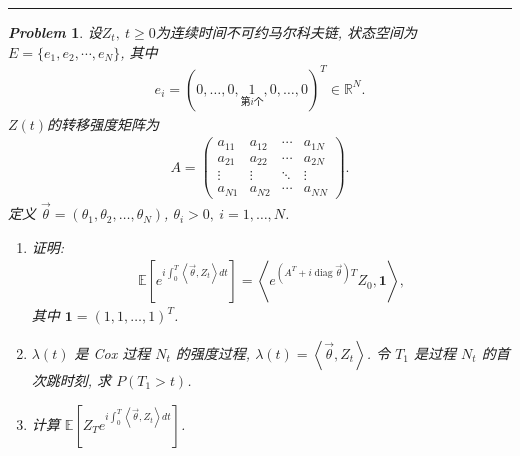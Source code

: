 \documentclass[12pt]{article}
\newtheorem*{problem}{\itshape Problem}
\begin{document}
\hrule height 1pt
\begin{problem}
  设$Z_t,\ t\ge 0$为连续时间不可约马尔科夫链, 状态空间为$E=\{e_1,e_2,\cdots, e_N\}$, 其中
  \begin{eqnarray*}
    {e}_i = (0, \ldots, 0, \underset{\text{第}i \text{个}}{1}, 0, \ldots, 0)^T \in \mathbb{R}^N.
  \end{eqnarray*}
  $Z(t)$的转移强度矩阵为
  \begin{eqnarray*}
    A = \begin{pmatrix}
      a_{11} & a_{12} & \cdots & a_{1N} \\
      a_{21} & a_{22} & \cdots & a_{2N} \\
      \vdots & \vdots & \ddots & \vdots \\
      a_{N1} & a_{N2} & \cdots & a_{NN}
      \end{pmatrix}.
  \end{eqnarray*}
  定义 $\vec{\theta} = (\theta_1, \theta_2, \ldots, \theta_N)$, $\theta_i > 0, \ i = 1, \ldots, N$.
  \begin{enumerate}
    \item 证明:\begin{eqnarray*}
      \mathbb{E}\left[ e^{i \int_0^T \left \langle\vec{\theta},Z_t  \right \rangle dt} \right] =\left \langle e^{\left(A^T + i \operatorname{diag} \vec{\theta}\right) T} Z_0, \mathbf{1} \right \rangle,
    \end{eqnarray*}
    其中 $\mathbf{1} = (1, 1, \ldots, 1)^T$.
    \item $\lambda(t)$ 是 Cox 过程 $N_t$ 的强度过程, $\lambda(t) = \left \langle \vec{\theta}, Z_t \right \rangle$. 令 $T_1$ 是过程 $N_t$ 的首次跳时刻, 求 $P(T_1 > t)$.
    \item 计算 $ \mathbb{E}\left[ Z_T e^{i \int_0^T \left \langle\vec{\theta},Z_t  \right \rangle dt}  \right]$.
  \end{enumerate}
\end{problem}
\end{document}
